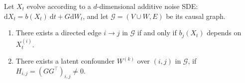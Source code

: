 \documentclass[twoside,11pt]{article}
\newcommand{\todo}[1]{\textbf{\textcolor{red}{TODO: #1}}}
\begin{document}
\begin{lemma}
Let $X_t$ evolve according to a $d$-dimensional additive noise SDE: $\mathrm{d}X_t = b(X_t) \: \mathrm{d}t+ G\mathrm{d}W_t$, and let $\mathcal{G}= (V \cup W, E)$ be its causal graph.
\begin{enumerate}[label=\alph*.]
\item  There exists a directed edge $i \to j$ in $\mathcal{G}$ if and only if $b_j(X_t)$ depends on $X_t^{(i)}$.
\item There exists a latent confounder $W^{(k)}$ over $(i,j)$ in $\mathcal{G}$, if $H_{i,j} = (GG^\top)_{i,j} \neq 0$. 
\end{enumerate}
\label{prop: identify_causal_graph_SDE_add_noise}
\end{lemma}
\end{document}
